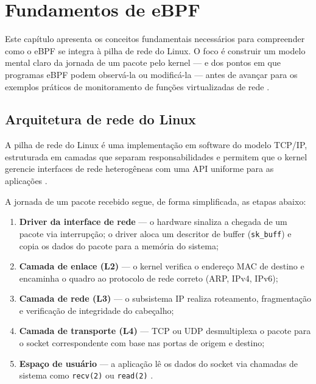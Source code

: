 \chapter{Fundamentos de eBPF}
\label{cap:fundamentos}

Este capítulo apresenta os conceitos fundamentais necessários para compreender
como o eBPF se integra à pilha de rede do Linux.
O foco é construir um modelo mental claro da jornada de um pacote pelo kernel ---
e dos pontos em que programas eBPF podem observá-la ou modificá-la ---
antes de avançar para os exemplos práticos de monitoramento de funções
virtualizadas de rede \cite{linuxkernel2024}.

\section{Arquitetura de rede do Linux}

A pilha de rede do Linux é uma implementação em software do modelo TCP/IP,
estruturada em camadas que separam responsabilidades e permitem que o kernel
gerencie interfaces de rede heterogêneas com uma API uniforme para as aplicações
\cite{gregg2020}.

A jornada de um pacote recebido segue, de forma simplificada, as etapas abaixo:

\begin{enumerate}
  \item \textbf{Driver da interface de rede} --- o hardware sinaliza a chegada de
        um pacote via interrupção; o driver aloca um descritor de buffer
        (\texttt{sk\_buff}) e copia os dados do pacote para a memória do sistema;
  \item \textbf{Camada de enlace (L2)} --- o kernel verifica o endereço MAC de
        destino e encaminha o quadro ao protocolo de rede correto (ARP, IPv4,
        IPv6);
  \item \textbf{Camada de rede (L3)} --- o subsistema IP realiza roteamento,
        fragmentação e verificação de integridade do cabeçalho;
  \item \textbf{Camada de transporte (L4)} --- TCP ou UDP desmultiplexa o pacote
        para o socket correspondente com base nas portas de origem e destino;
  \item \textbf{Espaço de usuário} --- a aplicação lê os dados do socket via
        chamadas de sistema como \texttt{recv(2)} ou \texttt{read(2)}
        \cite{manpages2024}.
\end{enumerate}

